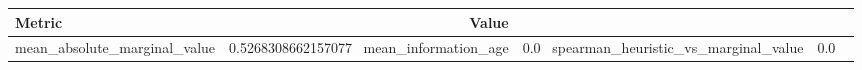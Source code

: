 \begin{tabular}{lr}
\hline
Metric & Value \\
\hline
mean\_absolute\_marginal\_value & 0.5268308662157077 \
mean\_information\_age & 0.0 \
spearman\_heuristic\_vs\_marginal\_value & 0.0 \
\hline
\end{tabular}
